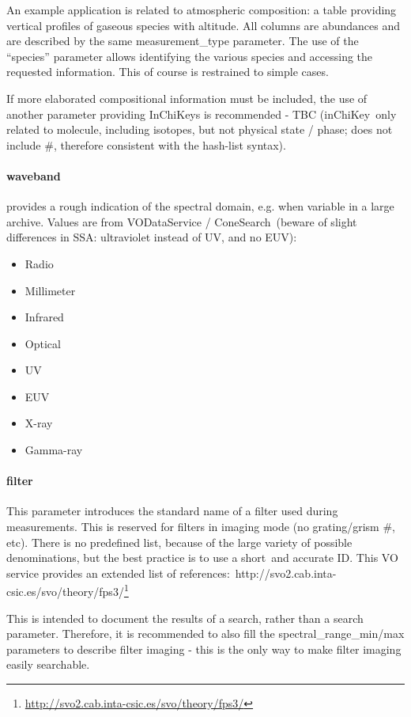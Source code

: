 \documentclass[11pt,a4paper]{ivoa}
\begin{document}
An example application is related to atmospheric composition: a table providing vertical profiles of gaseous species with altitude. All columns are abundances and are described by the same measurement\_type parameter. The use of the ``species'' parameter allows identifying the various species and accessing the requested information. This of course is restrained to simple cases.

If more elaborated compositional information must be included, the use of another parameter providing InChiKeys is recommended - TBC (inChiKey only related to molecule, including isotopes, but not physical state / phase; does not include \#, therefore consistent with the hash-list syntax).\\

\paragraph{waveband}

provides a rough indication of the spectral domain, e.g. when variable in a large archive. Values are from VODataService / ConeSearch (beware of slight differences in SSA: ultraviolet instead of UV, and no EUV): 

\begin{itemize}
\item Radio
\item Millimeter
\item Infrared
\item Optical
\item UV
\item EUV
\item X-ray
\item Gamma-ray
\end{itemize}

\paragraph{filter}

This parameter introduces the standard name of a filter used during measurements. This is reserved for filters in imaging mode (no grating/grism \#, etc). There is no predefined list, because of the large variety of possible denominations, but the best practice is to use a short and accurate ID. This VO service provides an extended list of references: http://svo2.cab.inta-csic.es/svo/theory/fps3/\footnote{\url{http://svo2.cab.inta-csic.es/svo/theory/fps3/}}

This is intended to document the results of a search, rather than a search parameter. Therefore, it is recommended to also fill the spectral\_range\_min/max parameters to describe filter imaging - this is the only way to make filter imaging easily searchable.
\end{document}
